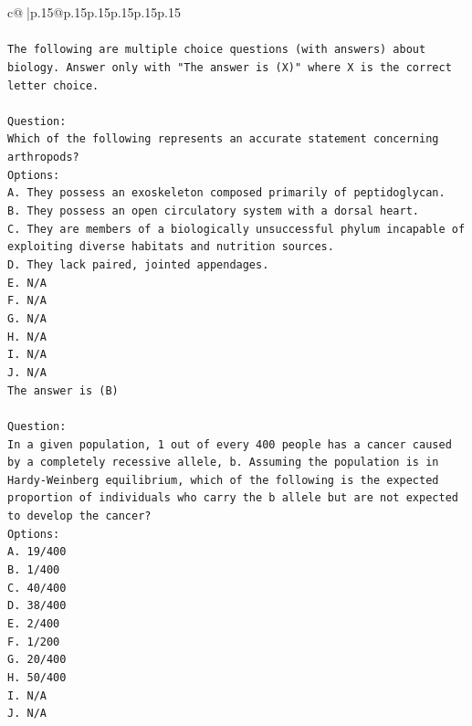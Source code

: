 \documentclass{article}
\begin{document}
{\begin{supertabular}{c@{$\;$}|p{.15\linewidth}@{}p{.15\linewidth}p{.15\linewidth}p{.15\linewidth}p{.15\linewidth}p{.15\linewidth}}
{{{\\ 
\\ 
\texttt{The following are multiple choice questions (with answers) about biology. Answer only with "The answer is (X)" where X is the correct letter choice.} \\
\\ 
\texttt{Question:} \\
\texttt{Which of the following represents an accurate statement concerning arthropods?} \\
\texttt{Options:} \\
\texttt{A. They possess an exoskeleton composed primarily of peptidoglycan.} \\
\texttt{B. They possess an open circulatory system with a dorsal heart.} \\
\texttt{C. They are members of a biologically unsuccessful phylum incapable of exploiting diverse habitats and nutrition sources.} \\
\texttt{D. They lack paired, jointed appendages.} \\
\texttt{E. N/A} \\
\texttt{F. N/A} \\
\texttt{G. N/A} \\
\texttt{H. N/A} \\
\texttt{I. N/A} \\
\texttt{J. N/A} \\
\texttt{The answer is (B)} \\
\\ 
\texttt{Question:} \\
\texttt{In a given population, 1 out of every 400 people has a cancer caused by a completely recessive allele, b. Assuming the population is in Hardy{-}Weinberg equilibrium, which of the following is the expected proportion of individuals who carry the b allele but are not expected to develop the cancer?} \\
\texttt{Options:} \\
\texttt{A. 19/400} \\
\texttt{B. 1/400} \\
\texttt{C. 40/400} \\
\texttt{D. 38/400} \\
\texttt{E. 2/400} \\
\texttt{F. 1/200} \\
\texttt{G. 20/400} \\
\texttt{H. 50/400} \\
\texttt{I. N/A} \\
\texttt{J. N/A} \\
}}}
\end{supertabular}}
\end{document}

